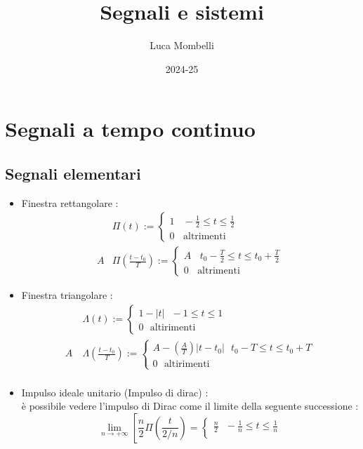 \documentclass{article}
\title{Segnali e sistemi  }
\author{Luca Mombelli}
\date{2024-25}
\theoremstyle{definition}
\begin{document}
	\maketitle
	\tableofcontents
	\newpage
	
\section{Segnali a tempo continuo}
\subsection{Segnali elementari }
\begin{itemize}
\item Finestra rettangolare : 
\begin{align*}
	&\Pi(t):=\begin{cases}
	1  \ \ \ \ - \frac{1}{2} \leq t \leq  \frac{1}{2} \\
	0 \ \ \ \ \text{altrimenti}
	\end{cases} \\ 
	A& \Pi(\frac{t-t_0}{T}):=\begin{cases}
A \ \ \ \ t_0 - \frac{T}{2} \leq t \leq t_0 + \frac{T}{2} \\
0 \ \ \ \ \text{altrimenti}
	\end{cases}
\end{align*} 
\item Finestra triangolare : 
\begin{align*}
&\Lambda(t):=\begin{cases}
1-|t|  \ \ \ -1 \leq t \leq 1 \\
0 \ \ \ \text{altirimenti}
\end{cases}\\
A \ &\Lambda(\frac{t-t_0}{T}):=\begin{cases}
	A-(\frac{A}{T})|t-t_0|  \ \ \ t_0-T \leq t \leq t_0+T\\
	0 \ \ \ \text{altirimenti}
\end{cases}\\
\end{align*}
\item Impulso ideale unitario (Impulso di dirac) : \\ 
è possibile vedere l'impulso di Dirac come il limite della seguente successione :
$$\lim_{n\rightarrow +\infty} \left[ \frac{n}{2} \Pi \left(\frac{t}{2/n}\right)=\begin{cases}
	\frac{n}{2} \ \ \ -\frac{1}{n}\leq t \leq \frac{1}{n}\\

\end{cases}$$
\end{itemize}
\end{document}

